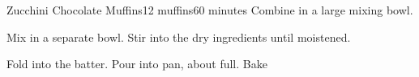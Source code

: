 \documentclass[../Cookbook.tex]{subfiles}
\begin{document}
\begin{recipe}[ZucchiniChocolateMuffins]{Zucchini Chocolate Muffins}{12 muffins}{60 minutes}
	Combine in a large mixing bowl.

	Mix in a separate bowl.
	Stir into the dry ingredients until moistened.

	Fold into the batter.
	Pour into pan, about  full.
	Bake 
\end{recipe}
\end{document}
